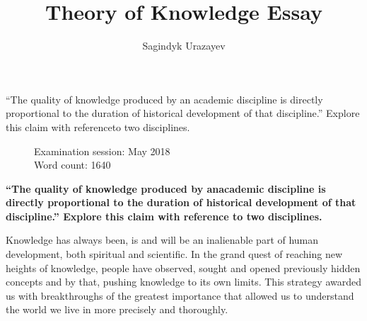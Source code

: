 \documentclass[12pt,a4paper]{article}
\title{Theory of Knowledge Essay}
\author{Sagindyk Urazayev}
\date{}
\begin{document}

\maketitle

\doublespacing

\begin{center}

  ``The quality of knowledge produced by an academic discipline is directly proportional to the duration of historical development of that discipline.'' Explore this claim with referenceto two disciplines.

\end{center}

\begin{figure}[b]
  \begin{flushleft}
    Examination session: May 2018\\
    Word count: 1640\\
    \end{flushleft}
  \end{figure}

\newpage
{}
\begin{center}
    \textbf{``The quality of knowledge produced by anacademic discipline is directly proportional to the duration of historical development of that discipline.'' Explore this claim with reference to two disciplines.}
\end{center}

Knowledge has always been, is and will be an inalienable part of human development, both spiritual and scientific. In the grand quest of reaching new heights of knowledge, people have observed, sought and opened previously hidden concepts and by that, pushing knowledge to its own limits. This strategy awarded us with breakthroughs of the greatest importance that allowed us to understand the world we live in more precisely and thoroughly. \\
\end{document}
